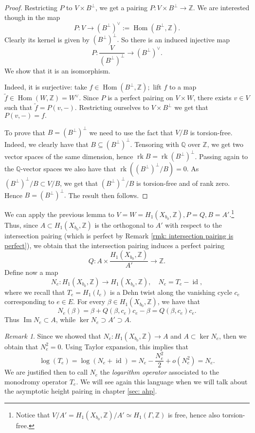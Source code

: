 \documentclass[a4paper,12 pt,titlepage,twoside]{book}
\newcommand{\numberset}{\mathbb}
\newcommand{\Z}{\numberset{Z}}
\newcommand{\Q}{\numberset{Q}}
\DeclareMathOperator{\Ima}{Im}
\DeclareMathOperator{\rk}{rk}
\DeclareMathOperator{\Hom}{Hom}
\DeclareMathOperator{\id}{id}
\theoremstyle{plain}
\theoremstyle{theorem}
\theoremstyle{definition}
\theoremstyle{remark}
\newtheorem{oss}[thm]{Remark}
\begin{document}
	\begin{proof}
		Restricting $P$ to $V \times B^\perp$, we get a pairing $P \colon V \times B^\perp \rightarrow \Z.$ We are interested though in the map $$P \colon V \rightarrow (B^\perp)^\vee := \Hom(B^\perp,\Z).$$ Clearly its kernel is given by $(B^\perp)^\perp.$ So there is an induced injective map $$P \colon \frac{V}{(B^\perp)^\perp} \rightarrow (B^\perp)^\vee.$$ We show that it is an isomorphism. 
		
		Indeed, it is surjective: take $f \in \Hom(B^\perp,\Z);$ lift $f$ to a map $\tilde{f} \in \Hom(W,\Z) = W^\vee.$ Since $P$ is a perfect pairing on $V\times W$, there exists $v \in V$ such that $\tilde{f} = P(v,-).$ Restricting ourselves to $V \times B^\perp$ we get that $P(v,-) = f.$
		
		To prove that $B = (B^\perp)^\perp$ we need to use the fact that $V/B$ is torsion-free. Indeed, we clearly have that $B \subseteq (B^\perp)^\perp.$ Tensoring with $\Q$ over $\Z$, we get two vector spaces of the same dimension, hence $\rk B = \rk (B^\perp)^\perp$. Passing again to the $\Q$-vector spaces we also have that $\rk\left((B^\perp)^\perp/B\right) = 0.$ As $(B^\perp)^\perp/B \subset V/B$, we get that $(B^\perp)^\perp/B$ is torsion-free and of rank zero. Hence $B = (B^\perp)^\perp.$ The result then follows.
	\end{proof}
	We can apply the previous lemma to $V=W= H_1(X_{b_0},\Z), P = Q, B=A'.$\footnote{Notice that $V/A' = H_1(X_{b_0},\Z)/ A' \simeq H_1(\Gamma,\Z)$ is free, hence also torsion-free.}
	Thus, since $A \subset H_1(X_{b_0},\Z)$ is the orthogonal to $A'$ with respect to the intersection pairing (which is perfect by Remark \ref{rmk: intersection pairing is perfect}), we obtain that the intersection pairing induces a perfect pairing $$Q \colon A \times \frac{H_1(X_{b_0},\Z)}{A'} \rightarrow \Z.$$
	Define now a map $$N_e \colon H_1(X_{b_0},\Z) \rightarrow H_1(X_{b_0},\Z), \quad N_e = T_e-\id,$$ where we recall that $T_e = H_1(l_e)$ is a Dehn twist along the vanishing cycle $c_e$ corresponding to $e \in E$. For every $\beta \in H_1(X_{b_0},\Z)$, we have that $$N_e(\beta)= \beta + Q(\beta, c_e) c_e - \beta=  Q(\beta, c_e) c_e.$$ Thus $\Ima N_e \subset A$, while $\ker N_e \supset A' \supset A.$
	\begin{oss}
		Since we showed that $N_e \colon H_1(X_{b_0},\Z) \rightarrow A$ and $A \subset \ker N_e$, then we obtain that $N_e^2=0.$ Using Taylor expansion, this implies that $$\log(T_e) = \log (N_e +\id) = N_e - \frac{N_e^2}{2} + o(N_e^2) = N_e.$$
		We are justified then to call $N_e$ the \emph{logarithm operator} associated to the monodromy operator $T_e.$ We will see again this language when we will talk about the asymptotic height pairing in chapter \ref{sec: ahp}.
	\end{oss}
\end{document}
